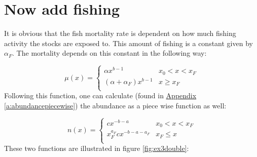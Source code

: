 \documentclass{article}
\numberwithin{equation}{section} %
\begin{document}
\section{Now add fishing}\label{sec:Ex3}
It is obvious that the fish mortality rate is dependent on how much fishing activity the stocks are exposed to. This amount of fishing is a constant given by $\alpha_F$. The mortality depends on this constant in the following way:

\begin{equation}
\mu(x) =
       \left\{
        \begin{array}{ll}
              \alpha x^{b-1} & x_0 < x < x_F \\
              (\alpha+\alpha_F) x^{b-1} &  x\geq x_F \\
        \end{array} 
\right.
\end{equation}
Following this function, one can calculate (found in \hyperref[a:abundancepiecewise]{Appendix \ref{a:abundancepiecewise}}\label{jmp:a:abundancepiecewise}) the abundance as a piece wise function as well:

\begin{equation}\label{eq:ex3nx}
    n(x) =
       \left\{
        \begin{array}{ll}
              cx^{-b-a} & x_0 < x < x_F \\
              x_F^{a_F}cx^{-b-a-a_F} & x_F\leq x \\
        \end{array} 
\right.
\end{equation}
These two functions are illustrated in figure \ref{fig:ex3double}:
\end{document}
